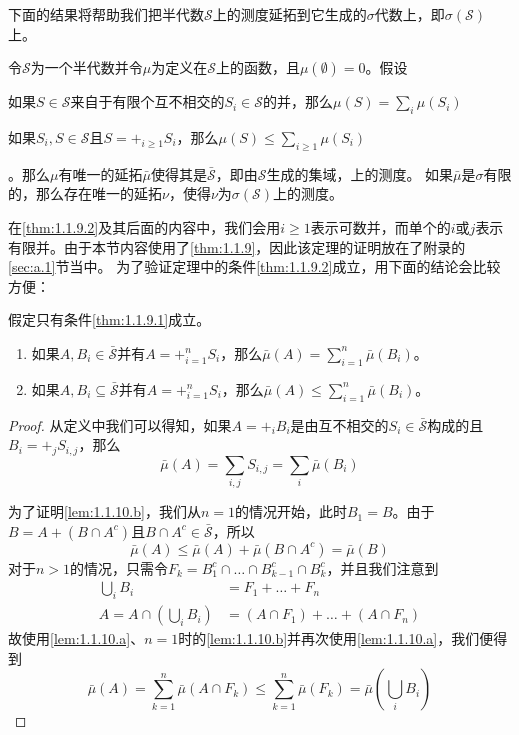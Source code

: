 \documentclass[../main.tex]{subfiles}
\begin{document}
下面的结果将帮助我们把半代数\(\mathcal{S}\)上的测度延拓到它生成的\(\sigma\)代数上，即\(\sigma(\mathcal{S})\)上。
\begin{theorem} \label{thm:1.1.9}
	令\(\mathcal{S}\)为一个半代数并令\(\mu\)为定义在\(\mathcal{S}\)上的函数，且\(\mu(\emptyset) = 0\)。假设\begin{enumerate*}
		\item \label{thm:1.1.9.1} 如果\(S \in \mathcal{S}\)来自于有限个互不相交的\(S_i \in \mathcal{S}\)的并，那么\(\mu(S) = \sum_i \mu(S_i)\)
		\item \label{thm:1.1.9.2} 如果\(S_i, S \in \mathcal{S}\)且\(S = +_{i \geq 1} S_i\)，那么\(\mu(S) \leq \sum_{i \geq 1} \allowbreak\mu(S_i)\)
	\end{enumerate*}。那么\(\mu\)有唯一的延拓\(\bar{\mu}\)使得其是\(\bar{\mathcal{S}}\)，即由\(\mathcal{S}\)生成的集域，上的测度。
	如果\(\bar{\mu}\)是\(\sigma\)有限的，那么存在唯一的延拓\(\nu\)，使得\(\nu\)为\(\sigma(\mathcal{S})\)上的测度。
\end{theorem}
在\ref{thm:1.1.9.2}及其后面的内容中，我们会用\(i \geq 1\)表示可数并，而单个的\(i\)或\(j\)表示有限并。由于本节内容使用了\autoref{thm:1.1.9}，因此该定理的证明放在了附录的\ref{sec:a.1}节当中。
为了验证定理中的条件\ref{thm:1.1.9.2}成立，用下面的结论会比较方便：
\begin{lemma} \label{lem:1.1.10}
	假定只有条件\ref{thm:1.1.9.1}成立。
	\begin{enumerate}[label*=(\alph*)]
		\item \label{lem:1.1.10.a} 如果\(A, B_i \in \bar{\mathcal{S}}\)并有\(A = +_{i=1}^n S_i\)，那么\(\bar{\mu}(A) = \sum_{i=1}^n \bar{\mu}(B_i)\)。
		\item \label{lem:1.1.10.b} 如果\(A, B_i \subseteq \bar{\mathcal{S}}\)并有\(A = +_{i=1}^n S_i\)，那么\(\bar{\mu}(A) \leq \sum_{i=1}^n \bar{\mu}(B_i)\)。
	\end{enumerate}
\end{lemma}
\begin{proof}
	从定义中我们可以得知，如果\(A = +_i B_i\)是由互不相交的\(S_i \in \bar{\mathcal{S}}\)构成的且\(B_i = +_j S_{i,j}\)，那么
	\[\bar{\mu}(A) = \sum_{i,j} S_{i,j} = \sum_{i} \bar{\mu}(B_i) \]

	为了证明\ref{lem:1.1.10.b}，我们从\(n = 1\)的情况开始，此时\(B_1 = B\)。由于\(B = A + (B \cap A^c)\)且\(B \cap A^c \in \bar{\mathcal{S}}\)，所以
	\[\bar{\mu}(A) \leq \bar{\mu}(A) + \bar{\mu}(B \cap A^c) = \bar{\mu}(B)\]
	对于\(n > 1\)的情况，只需令\(F_k = B_1^c \cap \dots \cap B_{k-1}^c \cap B_k^c\)，并且我们注意到
	\[\begin{split}
		\bigcup_i B_i &= F_1 + \dots + F_n\\
		A = A \cap \left(\bigcup_i B_i\right) &= (A \cap F_1) + \dots + (A \cap F_n)
	\end{split}\]
	故使用\ref{lem:1.1.10.a}、\(n = 1\)时的\ref{lem:1.1.10.b}并再次使用\ref{lem:1.1.10.a}，我们便得到
	\[\bar{\mu}(A) = \sum_{k=1}^n \bar{\mu}(A \cap F_k) \leq \sum_{k=1}^n \bar{\mu}(F_k) = \bar{\mu}\left(\bigcup_i B_i\right)\]
\end{proof}
\end{document}
